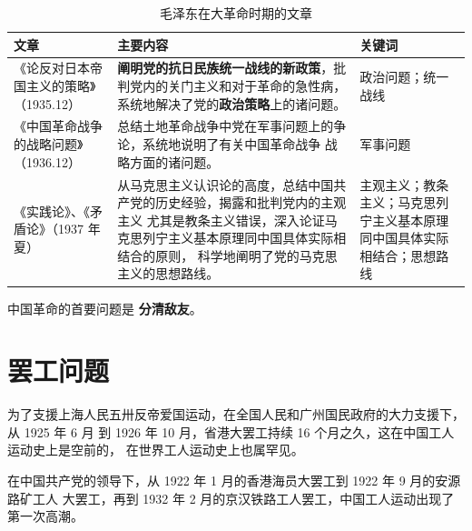 \documentclass[10pt, UTF8]{book} %
\begin{document}
\begin{table}[H]
    \centering
    \caption{毛泽东在大革命时期的文章}
    \begin{tabular}{p{}|p{}p{}}
        \hline 
        \textbf{文章} & \textbf{主要内容} & \textbf{关键词} \\
        \hline
        《论反对日本帝国主义的策略》（1935.12）&
        \textbf{阐明党的抗日民族统一战线的新政策}，批判党内的关门主义和对于革命的急性病，
        系统地解决了党的\textbf{政治策略}上的诸问题。
        & 政治问题；统一战线 \\ 
        \hline
        《中国革命战争的战略问题》（1936.12） &
        总结土地革命战争中党在军事问题上的争论，系统地说明了有关中国革命战争
        战略方面的诸问题。
        & 军事问题 \\ 
        \hline 
        《实践论》、《矛盾论》（1937 年夏）
        & 从马克思主义认识论的高度，总结中国共产党的历史经验，揭露和批判党内的主观主义
        尤其是教条主义错误，深入论证马克思列宁主义基本原理同中国具体实际相结合的原则，
        科学地阐明了党的马克思主义的思想路线。
        & 主观主义；教条主义；马克思列宁主义基本原理同中国具体实际相结合；思想路线 \\
        \hline 
    \end{tabular}
\end{table}

\begin{example}
    中国革命的首要问题是 \textbf{分清敌友}。
\end{example}

\section{罢工问题}

为了支援上海人民五卅反帝爱国运动，在全国人民和广州国民政府的大力支援下，从 1925 年 6 月
到 1926 年 10 月，省港大罢工持续 16 个月之久，这在中国工人运动史上是空前的，
在世界工人运动史上也属罕见。

在中国共产党的领导下，从 1922 年 1 月的香港海员大罢工到 1922 年 9 月的安源路矿工人
大罢工，再到 1932 年 2 月的京汉铁路工人罢工，中国工人运动出现了第一次高潮。



\end{document}
